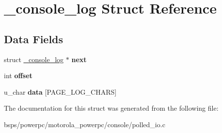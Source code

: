 \hypertarget{struct__console__log}{}\section{\+\_\+console\+\_\+log Struct Reference}
\label{struct__console__log}
\subsection*{Data Fields}
\begin{DoxyCompactItemize}
\item 
\mbox{\label{struct__console__log_a0ffbb30adac094acb1c5623a102a3cf5}} 
struct \mbox{\hyperlink{struct__console__log}{\+\_\+console\+\_\+log}} $\ast$ {\bfseries next}
\item 
\mbox{\label{struct__console__log_a4757dbff5ead345664ae511197a0854c}} 
int {\bfseries offset}
\item 
\mbox{\label{struct__console__log_ab96fb4e5cc32465cee5c86dbcafa599f}} 
u\+\_\+char {\bfseries data} \mbox{[}P\+A\+G\+E\+\_\+\+L\+O\+G\+\_\+\+C\+H\+A\+RS\mbox{]}
\end{DoxyCompactItemize}


The documentation for this struct was generated from the following file\+:\begin{DoxyCompactItemize}
\item 
bsps/powerpc/motorola\+\_\+powerpc/console/polled\+\_\+io.\+c\end{DoxyCompactItemize}
